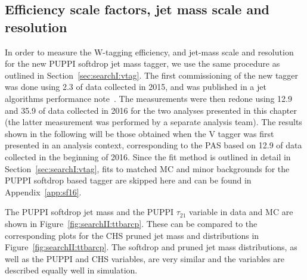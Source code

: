 \subsection{Efficiency scale factors, jet mass scale and resolution} 
\label{sec:searchII:wtagsf}
In order to measure the W-tagging efficiency, and jet-mass scale and resolution for the new PUPPI softdrop jet mass tagger, we use the same procedure as outlined in Section~\ref{sec:searchI:vtag}. The first commissioning of the new tagger was done using 2.3 \fbinv of data collected in 2015, and was published in a jet algorithms performance note~\cite{CMS-PAS-JME-16-003}. The measurements were then redone using 12.9 and 35.9 \fbinv of data collected in 2016 for the two analyses presented in this chapter (the latter measurement was performed by a separate analysis team). The results shown in the following will be those obtained when the V tagger was first presented in an analysis context, corresponding to the PAS based on 12.9 \fbinv of data collected in the beginning of 2016. Since the fit method is outlined in detail in Section~\ref{sec:searchI:vtag}, fits to matched \ttbar MC and minor backgrounds for the PUPPI softdrop based tagger are skipped here and can be found in Appendix~\ref{app:sf16}.\par
The PUPPI softdrop jet mass and the PUPPI $\tau_{21}$ variable in data and MC are shown in Figure~\ref{fig:searchII:ttbarcp}. These can be compared to the corresponding plots for the CHS pruned jet mass and \nsubj distributions in Figure~\ref{fig:searchII:ttbarcp}. The softdrop and pruned jet mass distributions, as well as the PUPPI and CHS \nsubj variables, are very similar and the variables are described equally well in simulation.
